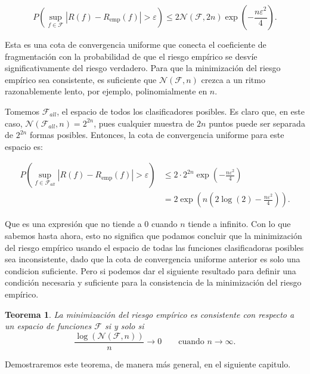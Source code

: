 \documentclass{report}
\newtheorem{thm}{Teorema}[section]
\begin{document}
\begin{equation}
    P\left(\sup_{f \in \mathcal{F}} |R(f) - R_{\text{emp}}(f)| > \varepsilon \right) \leq
    2\mathcal{N}(\mathcal{F}, 2n) \exp\left(-\frac{n\varepsilon^2}{4}\right). \label{eq: cota convergencia coeficiente fragmentacion}
\end{equation}

Esta es una cota de convergencia uniforme que conecta el coeficiente de fragmentación con la probabilidad de
que el riesgo empírico se desvíe significativamente del riesgo verdadero. Para que la minimización del riesgo
empírico sea consistente, es suficiente que $\mathcal{N}(\mathcal{F}, n)$ crezca a un ritmo razonablemente lento, por ejemplo,
polinomialmente en \(n\).

Tomemos $\mathcal{F}_{all}$, el espacio de todos los clasificadores posibles. Es claro que, en este caso, $\mathcal{N}(\mathcal{F}_{all}, n)=2^{2n}$,
pues cualquier muestra de $2n$ puntos puede ser separada de $2^{2n}$ formas posibles. Entonces, la cota de convergencia uniforme para este espacio
es:

\[
\begin{aligned}
P\left(\sup_{f \in \mathcal{F}_{all}} |R(f) - R_{\text{emp}}(f)| > \varepsilon \right)
&\leq 2\cdot 2^{2n} \exp\left(-\frac{n\varepsilon^2}{4}\right) \\
&= 2\exp\left(n\left( 2\log(2) - \frac{n\varepsilon^2}{4}\right)\right).
\end{aligned}
\]

Que es una expresión que no tiende a $0$ cuando $n$ tiende a infinito. Con lo que sabemos hasta ahora, esto no significa que podamos
concluir que la minimización del riesgo empírico
usando el espacio de todas las funciones clasificadoras posibles sea inconsistente, dado que la cota de convergencia uniforme anterior
es solo una condicion suficiente. Pero si podemos dar el siguiente resultado para definir una condición necesaria y suficiente para
la consistencia de la minimización del riesgo empírico.
\begin{thm}\label{thm: consistencia ssi}
    La minimización del riesgo empírico es consistente con respecto a un espacio de funciones $\mathcal{F}$ si y solo si
    \[
    \frac{\log\left(\mathcal{N}(\mathcal{F}, n)\right)}{n} \rightarrow 0 \qquad \text{cuando } n \to \infty.
    \]

\end{thm}

Demostraremos este teorema, de manera más general, en el siguiente capitulo.
\end{document}
